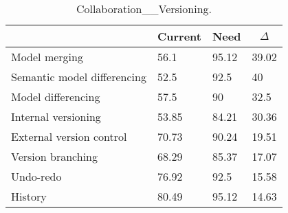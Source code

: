 
  \begin{table*}[]
  \centering
  \notsotiny
  \caption{ Collaboration__Versioning.}
\label{tab:collaboration__versioning}
\begin{tabular}{|l|l|l|l|}
  \hline
  \rowcolor[HTML]{C0C0C0}
    \multicolumn{1}{|c|}{Feature} & \multicolumn{1}{c|}{Current} & \multicolumn{1}{c|}{Need} & \multicolumn{1}{c|}{$\Delta$} \\ \hline
  Model merging & 56.1 & 95.12 & 39.02 \\ \hline 
Semantic model differencing & 52.5 & 92.5 & 40 \\ \hline 
Model differencing & 57.5 & 90 & 32.5 \\ \hline 
Internal versioning & 53.85 & 84.21 & 30.36 \\ \hline 
External version control & 70.73 & 90.24 & 19.51 \\ \hline 
Version branching & 68.29 & 85.37 & 17.07 \\ \hline 
Undo-redo & 76.92 & 92.5 & 15.58 \\ \hline 
History & 80.49 & 95.12 & 14.63 \\ \hline 
\end{tabular}%
  \end{table*}
